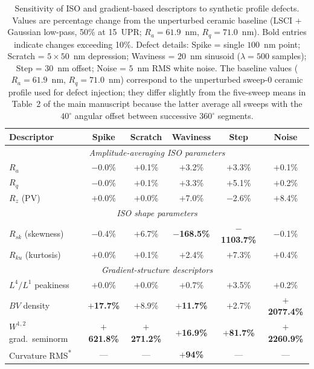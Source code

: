 \documentclass[review]{elsarticle}
\begin{document}
\begin{table}[H]
\centering
\small
\caption{Sensitivity of ISO and gradient-based descriptors to synthetic profile defects. Values are percentage change from the unperturbed ceramic baseline (LSCI + Gaussian low-pass, 50\% at 15~UPR; $R_a=61.9$~nm, $R_q=71.0$~nm). Bold entries indicate changes exceeding 10\%. Defect details: Spike = single $100$~nm point; Scratch = $5\times50$~nm depression; Waviness = $20$~nm sinusoid ($\lambda=500$ samples); Step = $30$~nm offset; Noise = $5$~nm RMS white noise. The baseline values ($R_a=61.9$~nm, $R_q=71.0$~nm) correspond to the unperturbed sweep-0 ceramic profile used for defect injection; they differ slightly from the five-sweep means in Table~2 of the main manuscript because the latter average all sweeps with the $40^\circ$ angular offset between successive $360^\circ$ segments.}
\label{tab:supp_descriptor_sensitivity}
\begin{tabular}{lccccc}
\toprule
Descriptor & Spike & Scratch & Waviness & Step & Noise \\
\midrule
\multicolumn{6}{c}{\textit{Amplitude-averaging ISO parameters}} \\
$R_a$ & $-$0.0\% & $+$0.1\% & $+$3.2\% & $+$3.3\% & $+$0.1\% \\
$R_q$ & $-$0.0\% & $+$0.1\% & $+$3.3\% & $+$5.1\% & $+$0.2\% \\
$R_z$ (PV) & $+$0.0\% & $+$0.0\% & $+$7.0\% & $-$2.6\% & $+$8.4\% \\
\multicolumn{6}{c}{\textit{ISO shape parameters}} \\
$R_{sk}$ (skewness) & $-$0.4\% & $+$6.7\% & \textbf{$-$168.5\%} & \textbf{$-$1103.7\%} & $-$0.1\% \\
$R_{ku}$ (kurtosis) & $+$0.0\% & $+$0.1\% & $+$2.4\% & $+$7.3\% & $+$0.4\% \\
\multicolumn{6}{c}{\textit{Gradient-structure descriptors}} \\
$L^4/L^1$ peakiness & $+$0.0\% & $+$0.0\% & $+$0.7\% & $+$3.5\% & $+$0.2\% \\
$BV$ density & \textbf{$+$17.7\%} & $+$8.9\% & \textbf{$+$11.7\%} & $+$2.7\% & \textbf{$+$2077.4\%} \\
$W^{1,2}$ grad.\ seminorm & \textbf{$+$621.8\%} & \textbf{$+$271.2\%} & \textbf{$+$16.9\%} & \textbf{$+$81.7\%} & \textbf{$+$2260.9\%} \\
Curvature RMS\textsuperscript{*} & --- & --- & \textbf{$+$94\%} & --- & --- \\
\bottomrule
\end{tabular}
\end{table}
\end{document}
